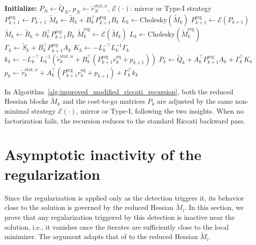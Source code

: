 \documentclass[class=scrbook, crop=false]{standalone}
\begin{document}
\begin{algorithm}[htbp]
\caption{Backward pass of improved modified Riccati recursion}
\label{alg:improved_modified_riccati_recursion}
\begin{algorithmic}[1]
\State\textbf{Initialize:} $P_N \gets \tilde{Q}_N$, $p_N \gets \tilde{r}_N^{\mathrm{stat}, x}$, $\mathcal{E}(\cdot)$: mirror or Type-I strategy
\Statex 
{}
    \State $P_{k+1}^\mathrm{reg} \gets P_{k+1}$ 
    \State $\tilde{M}_k \gets \tilde{R}_k + B_k^\top P_{k+1}^\mathrm{reg} B_k$
    \State $L_k \gets \mathrm{Cholesky}(\tilde{M}_k)$
        \State $P_{k+1}^\mathrm{reg} \gets \mathcal{E}(P_{k+1})$ 
        \State $\tilde{M}_k \gets \tilde{R}_k + B_k^\top P_{k+1}^\mathrm{reg} B_k$
        \State $\tilde{M}_k^\mathrm{reg} \gets \mathcal{E}(\tilde{M}_k)$ 
        \State $L_k \gets \mathrm{Cholesky}(\tilde{M}_k^\mathrm{reg})$
    \EndIf
    \State $\Gamma_k \gets \tilde{S}_k + B_k^\top P_{k+1}^\mathrm{reg} A_k$
    \Statex
    \State $K_k \gets -L_k^{-\top} L_k^{-1} \Gamma_k$
    \State $k_k \gets -L_k^{-\top} L_k^{-1} \left(\tilde{r}_k^{\mathrm{stat}, u} + B_k^\top (P_{k+1}^\mathrm{reg} r_k^{\mathrm{eq}} + p_{k+1})\right)$
    \Statex
    \State $P_k \gets \tilde{Q}_k + A_k^\top P_{k+1}^\mathrm{reg} A_k + \Gamma_k^\top K_k$
    \State $p_k \gets \tilde{r}_k^{\mathrm{stat}, x} + A_k^\top (P_{k+1}^\mathrm{reg} r_k^{\mathrm{eq}} + p_{k+1}) + \Gamma_k^\top k_k$
\EndFor
\end{algorithmic}
\end{algorithm}

In Algorithm~\ref{alg:improved_modified_riccati_recursion}, 
both the reduced Hessian blocks $\tilde{M}_k$ and the cost-to-go matrices $P_k$ are adjusted 
by the same non-minimal strategy $\mathcal{E}(\cdot)$, mirror or Type-I, following the two insights. 
When no factorization fails, the recursion reduces to the standard Riccati backward pass.

\section{Asymptotic inactivity of the regularization}
\label{sec:asymptotic_inactivity}
Since the regularization is applied only as the detection triggers it,
its behavior close to the solution is governed by the reduced Hessian $\tilde{M}_i$.
In this section,
we prove that any regularization triggered by this detection is inactive near the solution,
i.e., it vanishes once the iterates are sufficiently close to the local minimizer.
The argument adapts that of \cite{absilNewtonKKTInteriorpointMethods2007} to the reduced Hessian $\tilde{M}_i$.
\end{document}
